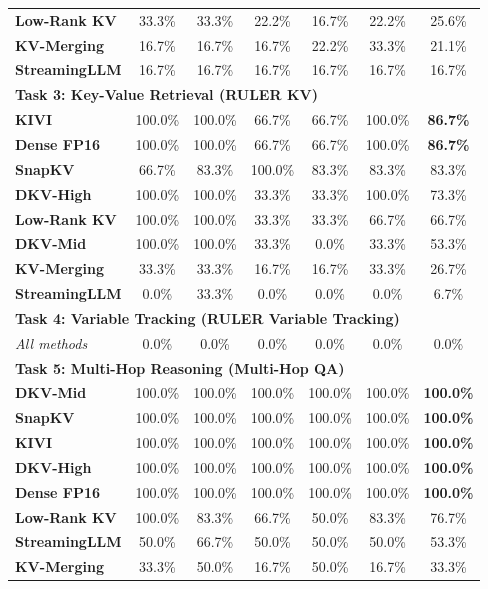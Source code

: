 \documentclass[10pt]{article}
\theoremstyle{definition}
\begin{document}
\begin{table}[h]
\begin{tabular}{lcccccc}
\textbf{Low-Rank KV} & 33.3\% & 33.3\% & 22.2\% & 16.7\% & 22.2\% & 25.6\% \\
\textbf{KV-Merging} & 16.7\% & 16.7\% & 16.7\% & 22.2\% & 33.3\% & 21.1\% \\
\textbf{StreamingLLM} & 16.7\% & 16.7\% & 16.7\% & 16.7\% & 16.7\% & 16.7\% \\
\midrule
\multicolumn{7}{l}{\textbf{Task 3: Key-Value Retrieval (RULER KV)}} \\
\textbf{KIVI} & 100.0\% & 100.0\% & 66.7\% & 66.7\% & 100.0\% & \textbf{86.7\%} \\
\textbf{Dense FP16} & 100.0\% & 100.0\% & 66.7\% & 66.7\% & 100.0\% & \textbf{86.7\%} \\
\textbf{SnapKV} & 66.7\% & 83.3\% & 100.0\% & 83.3\% & 83.3\% & 83.3\% \\
\textbf{DKV-High} & 100.0\% & 100.0\% & 33.3\% & 33.3\% & 100.0\% & 73.3\% \\
\textbf{Low-Rank KV} & 100.0\% & 100.0\% & 33.3\% & 33.3\% & 66.7\% & 66.7\% \\
\textbf{DKV-Mid} & 100.0\% & 100.0\% & 33.3\% & 0.0\% & 33.3\% & 53.3\% \\
\textbf{KV-Merging} & 33.3\% & 33.3\% & 16.7\% & 16.7\% & 33.3\% & 26.7\% \\
\textbf{StreamingLLM} & 0.0\% & 33.3\% & 0.0\% & 0.0\% & 0.0\% & 6.7\% \\
\midrule
\multicolumn{7}{l}{\textbf{Task 4: Variable Tracking (RULER Variable Tracking)}} \\
\textit{All methods} & 0.0\% & 0.0\% & 0.0\% & 0.0\% & 0.0\% & 0.0\% \\
\midrule
\multicolumn{7}{l}{\textbf{Task 5: Multi-Hop Reasoning (Multi-Hop QA)}} \\
\textbf{DKV-Mid} & 100.0\% & 100.0\% & 100.0\% & 100.0\% & 100.0\% & \textbf{100.0\%} \\
\textbf{SnapKV} & 100.0\% & 100.0\% & 100.0\% & 100.0\% & 100.0\% & \textbf{100.0\%} \\
\textbf{KIVI} & 100.0\% & 100.0\% & 100.0\% & 100.0\% & 100.0\% & \textbf{100.0\%} \\
\textbf{DKV-High} & 100.0\% & 100.0\% & 100.0\% & 100.0\% & 100.0\% & \textbf{100.0\%} \\
\textbf{Dense FP16} & 100.0\% & 100.0\% & 100.0\% & 100.0\% & 100.0\% & \textbf{100.0\%} \\
\textbf{Low-Rank KV} & 100.0\% & 83.3\% & 66.7\% & 50.0\% & 83.3\% & 76.7\% \\
\textbf{StreamingLLM} & 50.0\% & 66.7\% & 50.0\% & 50.0\% & 50.0\% & 53.3\% \\
\textbf{KV-Merging} & 33.3\% & 50.0\% & 16.7\% & 50.0\% & 16.7\% & 33.3\% \\
\bottomrule
\end{tabular}
\end{table}
\end{document}
